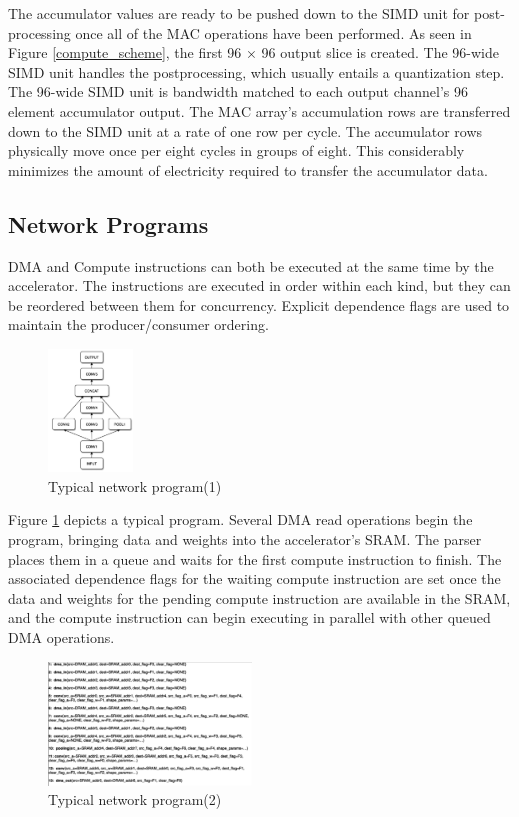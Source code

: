 \documentclass[letterpaper, 10 pt, conference]{ieeeconf}  %
\begin{document}
The accumulator values are ready to be pushed down to the SIMD unit for post-processing once all of the MAC operations have been performed. As seen in Figure \ref{compute_scheme}, the first 96 × 96 output slice is created. The 96-wide SIMD unit handles the postprocessing, which usually entails a quantization step. The 96-wide SIMD unit is bandwidth matched to each output channel's 96 element accumulator output. The MAC array's accumulation rows are transferred down to the SIMD unit at a rate of one row per cycle. The accumulator rows physically move once per eight cycles in groups of eight\cite{fsd_computer}. This considerably minimizes the amount of electricity required to transfer the accumulator data.

\subsection{Network Programs}

DMA and Compute instructions can both be executed at the same time by the accelerator. The instructions are executed in order within each kind, but they can be reordered between them for concurrency. Explicit dependence flags are used to maintain the producer/consumer ordering. 

\begin{figure}[hbt!]
\centering
\includegraphics[width=0.2\textwidth]{gfx/typical_network_program.png}
\caption{Typical network program(1)}
\label{typical_network_program}
\end{figure}

Figure \ref{typical_network_program} depicts a typical program. Several DMA read operations begin the program, bringing data and weights into the accelerator's SRAM. The parser places them in a queue and waits for the first compute instruction to finish. The associated dependence flags for the waiting compute instruction are set once the data and weights for the pending compute instruction are available in the SRAM, and the compute instruction can begin executing in parallel with other queued DMA operations.

\begin{figure}[hbt!]
\centering
\includegraphics[width=0.48\textwidth]{gfx/DMA_procedure.png}
\caption{Typical network program(2)}
\label{typical_network_program_2}
\end{figure}
\end{document}
